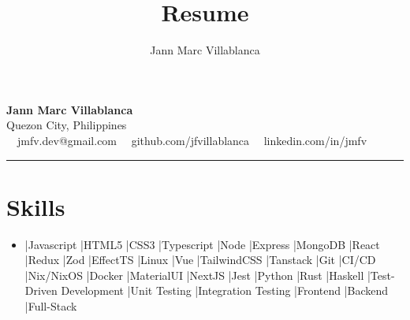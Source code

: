\documentclass[11pt,letterpaper]{article}
\author{Jann Marc Villablanca}
\title{Resume}
\newenvironment{pipeseparateditemize}[1][]{
    \begin{itemize}[label={}, #1]
        \item
    \def\separator{}
    \def\item{\ifhmode \unskip\space|\space\fi\relax\ignorespaces\separator}
}{%
    \end{itemize}
}
\begin{document}
\begin{center}
	{\LARGE \textbf{Jann Marc Villablanca}}\\
	Quezon City, Philippines
	\vspace{0.05cm}
	\\
	\raisebox{-0.2\height}{\Large \faEnvelopeSquare} \ \ jmfv.dev@gmail.com \hfill \raisebox{-0.2\height}{\Large \faGithubSquare} \ \ github.com/jfvillablanca \hfill \raisebox{-0.2\height}{\Large \faLinkedinSquare} \ \ linkedin.com/in/jmfv
\end{center}

\hrule
\section*{\Large Skills}

\begin{pipeseparateditemize}[leftmargin=1em,noitemsep]
    \item Javascript
    \item HTML5
    \item CSS3
    \item Typescript
    \item Node
    \item Express
    \item MongoDB
    \item React
    \item Redux
    \item Zod
    \item EffectTS
    \item Linux
    \item Vue
    \item TailwindCSS
    \item Tanstack
    \item Git
    \item CI/CD
    \item Nix/NixOS
    \item Docker
    \item MaterialUI
    \item NextJS
    \item Jest
    \item Python
    \item Rust
    \item Haskell
    \item Test-Driven Development
    \item Unit Testing
    \item Integration Testing
    \item Frontend
    \item Backend
    \item Full-Stack
\end{pipeseparateditemize}
\end{document}
